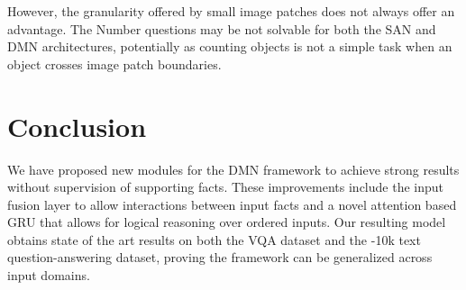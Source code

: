 \documentclass{article}
\begin{document}
However, the granularity offered by small image patches does not always offer an advantage. The Number questions may be not solvable  for both the SAN and DMN architectures, potentially as counting objects is not a simple task when an object crosses image patch boundaries.



\section{Conclusion}
We have proposed new modules for the DMN framework to achieve strong results without supervision of supporting facts.
These improvements include the input fusion layer to allow interactions between input facts and a novel attention based GRU that allows for logical reasoning over ordered inputs.
Our resulting model obtains state of the art results on both the VQA dataset and the \babi-10k text question-answering dataset, proving the framework can be generalized across input domains.






\end{document}
